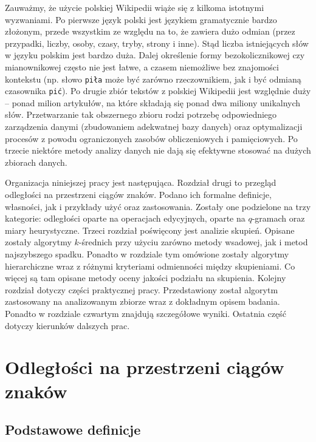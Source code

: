 \documentclass{praca1}
\begin{document}
Zauważmy, że użycie polskiej Wikipedii wiąże się z kilkoma istotnymi wyzwaniami. Po pierwsze język polski jest językiem gramatycznie bardzo złożonym, przede wszystkim ze względu na to, że zawiera dużo odmian (przez przypadki, liczby, osoby, czasy, tryby, strony i inne). Stąd liczba istniejących słów w języku polskim jest bardzo duża. Dalej określenie formy bezokolicznikowej czy mianownikowej często nie jest łatwe, a czasem niemożliwe bez znajomości kontekstu (np. słowo \verb|piła| może być zarówno rzeczownikiem, jak i być odmianą czasownika \verb|pić|). Po drugie zbiór tekstów z polskiej Wikipedii jest względnie duży -- ponad milion artykułów,  na które składają się ponad dwa miliony unikalnych słów. Przetwarzanie tak obszernego zbioru rodzi potrzebę odpowiedniego zarządzenia danymi (zbudowaniem adekwatnej bazy danych) oraz optymalizacji procesów z powodu ograniczonych zasobów obliczeniowych i pamięciowych. Po trzecie niektóre metody analizy danych nie dają się efektywne stosować na dużych zbiorach danych. 


Organizacja niniejszej pracy jest następująca. Rozdział drugi to przegląd odległości na przestrzeni ciągów znaków.  Podano ich formalne definicje, własności, jak i przykłady użyć oraz zastosowania. Zostały one podzielone na trzy kategorie: odległości oparte na operacjach edycyjnych, oparte na $q$-gramach oraz miary heurystyczne. Trzeci rozdział poświęcony jest analizie skupień. Opisane zostały algorytmy $k$-średnich przy użyciu zarówno metody wsadowej, jak i metod najszybszego spadku. Ponadto w rozdziale tym omówione zostały algorytmy hierarchiczne wraz z różnymi kryteriami odmienności między skupieniami. Co więcej są tam opisane metody oceny jakości podziału na skupienia. Kolejny rozdział dotyczy części praktycznej pracy. Przedstawiony został algorytm zastosowany na analizowanym zbiorze wraz z dokładnym opisem badania. Ponadto w rozdziale czwartym znajdują szczegółowe wyniki. Ostatnia część dotyczy kierunków dalszych prac.




\chapter{Odległości na przestrzeni ciągów znaków}
\label{metryki-na-przestrzeni-ciagow-znakow}


\section{Podstawowe definicje}
\end{document}
